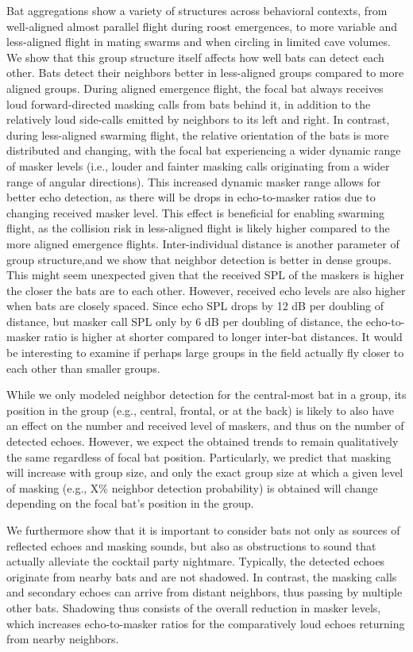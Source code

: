 \documentclass[
]{book}
\begin{document}
Bat aggregations show a variety of structures across behavioral contexts, from well-aligned almost parallel flight during roost emergences, to more variable and less-aligned flight in mating swarms and when circling in limited cave volumes. We show that this group structure itself affects how well bats can detect each other. Bats detect their neighbors better in less-aligned groups compared to more aligned groups. During aligned emergence flight, the focal bat always receives loud forward-directed masking calls from bats behind it, in addition to the relatively loud side-calls emitted by neighbors to its left and right. In contrast, during less-aligned swarming flight, the relative orientation of the bats is more distributed and changing, with the focal bat experiencing a wider dynamic range of masker levels (i.e., louder and fainter masking calls originating from a wider range of angular directions). This increased dynamic masker range allows for better echo detection, as there will be drops in echo-to-masker ratios due to changing received masker level. This effect is beneficial for enabling swarming flight, as the collision risk in less-aligned flight is likely higher compared to the more aligned emergence flights. Inter-individual distance is another parameter of group structure,and we show that neighbor detection is better in dense groups. This might seem unexpected given that the received SPL of the maskers is higher the closer the bats are to each other. However, received echo levels are also higher when bats are closely spaced. Since echo SPL drops by 12 dB per doubling of distance, but masker call SPL only by 6 dB per doubling of distance, the echo-to-masker ratio is higher at shorter compared to longer inter-bat distances. It would be interesting to examine if perhaps large groups in the field actually fly closer to each other than smaller groups.

While we only modeled neighbor detection for the central-most bat in a group, its position in the group (e.g., central, frontal, or at the back) is likely to also have an effect on the number and received level of maskers, and thus on the number of detected echoes. However, we expect the obtained trends to remain qualitatively the same regardless of focal bat position. Particularly, we predict that masking will increase with group size, and only the exact group size at which a given level of masking (e.g., X\% neighbor detection probability) is obtained will change depending on the focal bat's position in the group.

We furthermore show that it is important to consider bats not only as sources of reflected echoes and masking sounds, but also as obstructions to sound that actually alleviate the cocktail party nightmare. Typically, the detected echoes originate from nearby bats and are not shadowed. In contrast, the masking calls and secondary echoes can arrive from distant neighbors, thus passing by multiple other bats. Shadowing thus consists of the overall reduction in masker levels, which increases echo-to-masker ratios for the comparatively loud echoes returning from nearby neighbors.
\end{document}
